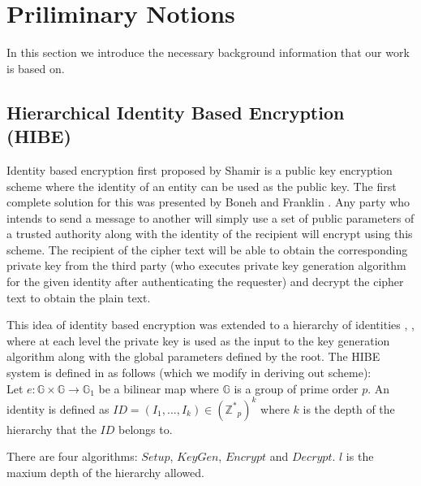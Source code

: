 \section{Priliminary Notions}

In this section we introduce the necessary background information that our work is based on.

\subsection{Hierarchical Identity Based Encryption (HIBE)}
Identity based encryption first proposed by Shamir\cite{Shamir:1985:ICS:19478.19483} is a public key encryption scheme where the identity of an entity can be used as the public key. The first complete solution for this was presented by Boneh and Franklin \cite{Boneh:2003:IEW:639069.639089}. Any party who intends to send a message to another will simply use a set of public parameters of a trusted authority along with the identity of the recipient will encrypt using this scheme. The recipient of the cipher text will be able to obtain the corresponding private key from the third party (who executes private key generation algorithm for the given identity after authenticating the requester) and decrypt the cipher text to obtain the plain text.

This idea of identity based encryption was extended to a hierarchy of identities \cite{Horwitz02towardhierarchical}, \cite{BBG05}, where at each level the private key is used as the input to the key generation algorithm along with the global parameters defined by the root. The HIBE system is defined in \cite{BBG05} as follows (which we modify in deriving out scheme):\\

Let $e : \mathbb{G} \times \mathbb{G} \to \mathbb{G}_1 $ be a bilinear map where $\mathbb{G}$ is a group of prime order $p$. An identity is defined as $ID = (I_1, ..., I_k) \in ({{\mathbb{Z}}^*}_p)^k$ where $k$ is the depth of the hierarchy that the $ID$ belongs to.

There are four algorithms: $Setup$, $KeyGen$, $Encrypt$ and $Decrypt$. $l$ is the maxium depth of the hierarchy allowed.\\

